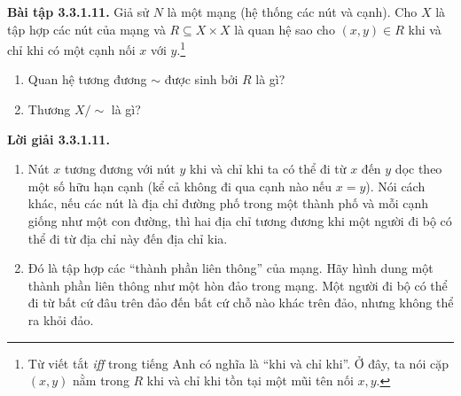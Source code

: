 \noindent\textbf{Bài tập 3.3.1.11.} Giả sử $N$ là một mạng (hệ thống các nút và cạnh). Cho $X$ là tập hợp các nút của mạng và $R\subseteq X\times X$ là quan hệ sao cho $(x,y)\in R$ khi và chỉ khi có một cạnh nối $x$ với $y$.\footnote{Từ viết tắt \emph{iff} trong tiếng Anh có nghĩa là ``khi và chỉ khi''. Ở đây, ta nói cặp $(x,y)$ nằm trong $R$ khi và chỉ khi tồn tại một mũi tên nối $x,y$.}
\begin{enumerate}[label=\alph*.]
\item Quan hệ tương đương $\sim$ được sinh bởi $R$ là gì?
\item Thương $X/{\sim}$ là gì?
\end{enumerate}
\noindent\textbf{Lời giải 3.3.1.11.}\keepwithnext
\begin{enumerate}[label=\alph*.]
\item Nút $x$ tương đương với nút $y$ khi và chỉ khi ta có thể đi từ $x$ đến $y$ dọc theo một số hữu hạn cạnh (kể cả không đi qua cạnh nào nếu $x=y$). Nói cách khác, nếu các nút là địa chỉ đường phố trong một thành phố và mỗi cạnh giống như một con đường, thì hai địa chỉ tương đương khi một người đi bộ có thể đi từ địa chỉ này đến địa chỉ kia.
\item Đó là tập hợp các ``thành phần liên thông'' của mạng. Hãy hình dung một thành phần liên thông như một hòn đảo trong mạng. Một người đi bộ có thể đi từ bất cứ đâu trên đảo đến bất cứ chỗ nào khác trên đảo, nhưng không thể ra khỏi đảo.
\end{enumerate}
